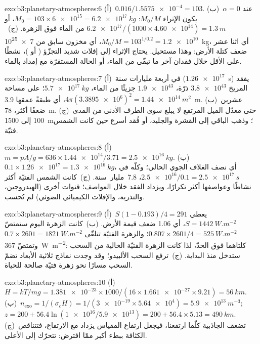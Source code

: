 \begin{solution}{exo:b3:planetary-atmospheres:6}
(أ)~$0.016/\num{1.5575e-4} = 103$. (ب)~عند $\alpha = 0$ يكون الإثراء
$M_0/M$: $M_0 = 103\times\num{6e15} = \qty{6.2e17}{kg}$، أو
$\num{6.2e17}/(1000\times\num{4.60e14}) = \qty{1.3}{m}$ من الماء فوق
الزهرة. (ج)~$M_0/M = 103^{1/0.2} = \num{1.2e10}$، أي مخزون سابق من
\qty{7e25}{kg}، أي اثنا عشر ضعف كتلة الأرض: وهذا مستحيل. يحتاج
الإثراء إلى إفلات شديد التجزّؤ ( أو )،
نشطًا على الأقل خلال فقدان آخر ما تبقّى من الماء، أو الحالة
المستقرّة مع إمداد بالماء.
\end{solution}

\begin{solution}{exo:b3:planetary-atmospheres:7}
(أ)~في أربعة مليارات سنة ($\num{1.26e17}$~s) يفقد المريخ
$\num{3.8e43}$ ذرّة، $\num{1.9e43}$ جزيئًا من الماء، $\qty{5.7e17}{kg}$؛
على مساحة $4\pi(\num{3.3895e6})^2 = \qty{1.44e14}{m^2}$، أي طبقةً
عمقها \qty{3.9}{m}. (ب)~عشرين ضعفًا أكثر، \qty{78}{m}. (ج)~حتى
معدّل الميل المرتفع لا يبلغ سوى الطرف الأدنى من المدى 100 إلى
\qty{1500}{m}؛ وذهب الباقي إلى القشرة والجليد، أو فُقد
أسرع حين كانت الشمس فتيّة.
\end{solution}

\begin{solution}{exo:b3:planetary-atmospheres:8}
(أ)~$m = pA/g = 636\times\num{1.44e14}/3.71 = \qty{2.5e16}{kg}$.
(ب)~$0.1\times\num{1.26e17} = \qty{1.3e16}{kg}$، أي نصف
الغلاف الجوي الحالي؛ وكلّه في $\num{2.5e16}/0.1 = \qty{2.5e17}{s}$،
\num{7.8}~مليار~سنة. (ج)~كانت الشمس الفتيّة أكثر نشاطًا وعواصفها
أكثر تكرارًا، ويزداد الفقد خلال العواصف؛ قنوات أخرى
(الهيدروجين، والتذرية، والإفلات الكيميائي الضوئي) لم تُحسب.
\end{solution}

\begin{solution}{exo:b3:planetary-atmospheres:9}
(أ)~$S(1 - 0.193)/4 = 291$ يعطي $S = \qty{1442}{W.m^{-2}}$، أي 1.06
ضعف قيمة الأرض. (ب)~كانت الزهرة اليوم ستمتصّ $0.807\times2601/4 =
\qty{525}{W.m^{-2}}$؛ والزهرة الفتيّة تتلقّى $0.7\times2601 = \qty{1821}{W.m^{-2}}$
وتمتصّ \qty{367}{W.m^{-2}}: كلتاهما فوق الحدّ، لذا
كانت الزهرة الفتيّة الخالية من السحب ستدخل  منذ البداية. (ج)~ترفع السحب
الألبيدو؛ وقد وجدت نماذج ثلاثية الأبعاد تضمّ السحب مسارًا
نحو زهرة فتيّة صالحة للحياة.
\end{solution}

\begin{solution}{exo:b3:planetary-atmospheres:10}
(أ)~$H = kT/mg = \num{1.381e-23}\times1000/(16\times\num{1.661e-27}\times9.21)
= \qty{56}{km}$. (ب)~$n_\mathrm{exo} = 1/(\sigma_c H) = 1/(\num{3e-19}\times
\num{5.64e4}) = \qty{5.9e13}{m^{-3}}$; $z = 200 + 56.4\ln(\num{1e16}/
\num{5.9e13}) = 200 + 56.4\times5.13 = \qty{490}{km}$. (ج)~تضعف الجاذبية
كلّما ارتفعنا، فيجعل ارتفاع المقياس يزداد مع الارتفاع، فتتناقص الكثافة
ببطء أكبر ممّا افترض: تتحرّك  إلى الأعلى.
\end{solution}

